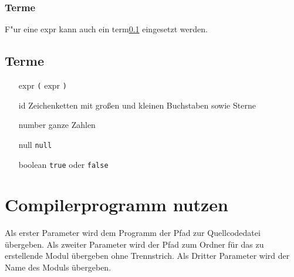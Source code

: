 \documentclass{article}
\begin{document}
\subsubsection{Terme}
F"ur eine expr kann auch ein term{\tiny\ref{term}} eingesetzt werden.

\subsection{Terme} \label{term}
\begin{itemize}
\item[expr]{\texttt{(} expr \texttt{)}}
\item[id]{Zeichenketten mit großen und kleinen Buchstaben sowie Sterne }
\item[number]{ganze Zahlen }
\item[null]{\texttt{null} }
\item[boolean]{\texttt{true} oder \texttt{false} }
\end{itemize}


\newpage
\section{Compilerprogramm nutzen}
Als erster Parameter wird dem Programm der Pfad zur Quellcodedatei übergeben. Als zweiter Parameter wird der Pfad zum Ordner für das zu erstellende Modul übergeben ohne Trennstrich. Als Dritter Parameter wird der Name des Moduls übergeben.
\end{document}
